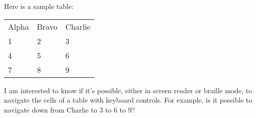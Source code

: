 \documentclass{article}
\begin{document}
Here is a sample table:

\begin{tabular}{lll}
Alpha & Bravo & Charlie \\
1 & 2 & 3 \\
4 & 5 & 6 \\
7 & 8 & 9 \\
\end{tabular}

I am interested to know if it's possible, either in screen reader or braille mode, to navigate the cells of a table with keyboard controls.  For example, is it possible to navigate down from Charlie to 3 to 6 to 9?
\end{document}
